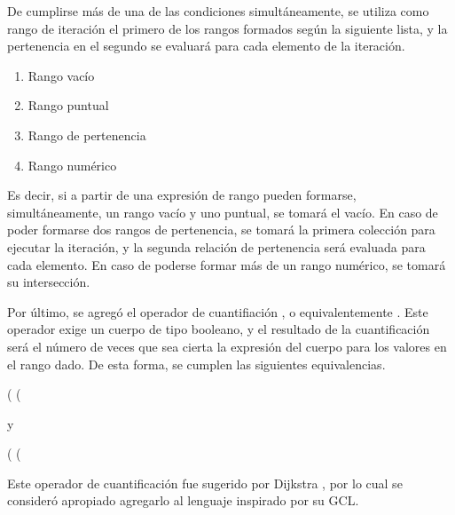 De cumplirse más de una de las condiciones simultáneamente, se utiliza como
rango de iteración el primero de los rangos formados según la siguiente lista, y
la pertenencia en el segundo se evaluará para cada elemento de la iteración.

\begin{enumerate}
	\item Rango vacío
	\item Rango puntual
	\item Rango de pertenencia
	\item Rango numérico
\end{enumerate}

Es decir, si a partir de una expresión de rango pueden formarse,
simultáneamente, un rango vacío y uno puntual, se tomará el vacío. En caso de
poder formarse dos rangos de pertenencia, se tomará la primera colección para
ejecutar la iteración, y la segunda relación de pertenencia será evaluada para
cada elemento. En caso de poderse formar más de un rango numérico, se tomará su
intersección.

Por último, se agregó el operador de cuantifiación , o
equivalentemente \ingra{#}. Este operador exige un cuerpo de tipo booleano, y el
resultado de la cuantificación será el número de veces que sea cierta la
expresión del cuerpo para los valores en el rango dado. De esta forma, se
cumplen las siguientes equivalencias.

\begin{gracielacode}
(%
    (%
\end{gracielacode}

y

\begin{gracielacode}
(%
    (%
\end{gracielacode}

Este operador de cuantificación fue sugerido por Dijkstra
,
por lo cual se consideró apropiado agregarlo al lenguaje inspirado por su GCL.

